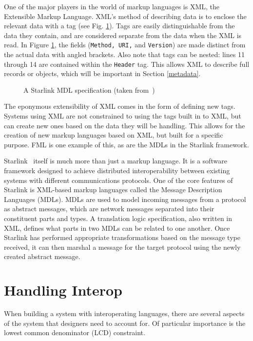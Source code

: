 \documentclass{sig-alternate}
\begin{document}
One of the major players in the world of markup languages is XML, the Extensible Markup Language. XML's method of describing data is to enclose the relevant data with a tag (see Fig. \ref{MDL1}). Tags are easily distinguishable from the data they contain, and are considered separate from the data when the XML is read. In Figure \ref{MDL1}, the fields ({\tt Method, URI,} and {\tt Version}) are made distinct from the actual data with angled brackets.
Also note that tags can be nested: lines 11 through 14 are contained within the {\tt Header} tag. This allows XML to describe full records or objects, which will be important in Section \ref{metadata}.


\begin{figure}
\caption{A Starlink MDL specification (taken from~\cite{Bromberg:2011})}
\label{MDL1}
\end{figure}


The eponymous extensibility of XML comes in the form of defining new tags. Systems using XML are not constrained to using the tags built in to XML, but can create new ones based on the data they will be handling. This allows for the creation of new markup languages based on XML, but built for a specific purpose. FML is one example of this, as are the MDLs in the Starlink framework.

Starlink~\cite{Bromberg:2011} itself is much more than just a markup language. It is a software framework designed to achieve distributed interoperability between existing systems with different communications protocols. One of the core features of Starlink is XML-based markup languages called the Message Description Languages (MDLs). MDLs are used to model incoming messages from a protocol as abstract messages, which are network messages separated into their constituent parts and types. A translation logic specification, also written in XML, defines what parts in two MDLs can be related to one another. Once Starlink has performed appropriate transformations based on the message type received, it can then marshal a message for the target protocol using the newly created abstract message.

\section{Handling Interop}\label{approaches}
When building a system with interoperating languages, there are several aspects of the system that designers need to account for. Of particular importance is the lowest common denominator (LCD) constraint.
\end{document}
